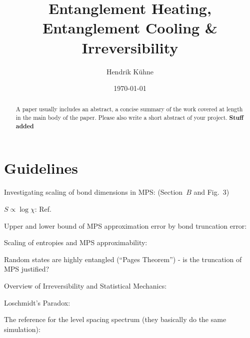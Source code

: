 \documentclass[reprint,amsmath,amssymb,aps,prb]{revtex4-2}
\begin{document}
    \title{Entanglement Heating, Entanglement Cooling \& Irreversibility}
    \author{Hendrik Kühne}
    \date{\today}

    \begin{abstract}
        A paper usually includes an abstract, a concise summary of the work covered at length in the main body of the paper. Please also write a short abstract of your project.
        \textbf{Stuff added}
    \end{abstract}

    \maketitle

    \section{Guidelines}

    \cite{Shaffer:2014:IrreversibilityAndEntanglement,Jizba:2004:MultifractalThermodynamics,Odavic:2023:RandomUnitaries}

    Investigating scaling of bond dimensions in MPS: \cite{Pirvu:2012:FiniteSizeVersusFiniteEntanglement} (Section~$B$
    and Fig.~3)

    $S\propto\log\chi$: Ref.~\cite{Pollmann:2009:FiniteEntanglementScaling}

    Upper and lower bound of MPS approximation error by bond truncation error: \cite{Verstraete:2006:faithfulMPS}

    Scaling of entropies and MPS approximability: \cite{Schuch:2008:EntropyScaling}

    Random states are highly entangled (``Pages Theorem'') \cite{Page:1993:AverageEntropy} - is the truncation of MPS justified?

    Overview of Irreversibility and Statistical Mechanics: \cite{Haar:1955:FoundationsStatisticalMechanics}

    Loschmidt's Paradox: \cite{Loschmidt:1876:LoschmidtParadox}

    The reference for the level spacing spectrum (they basically do the same simulation): \cite{Chamon:2014:EmergentIrreversibility}

    

    \appendix
\end{document}
